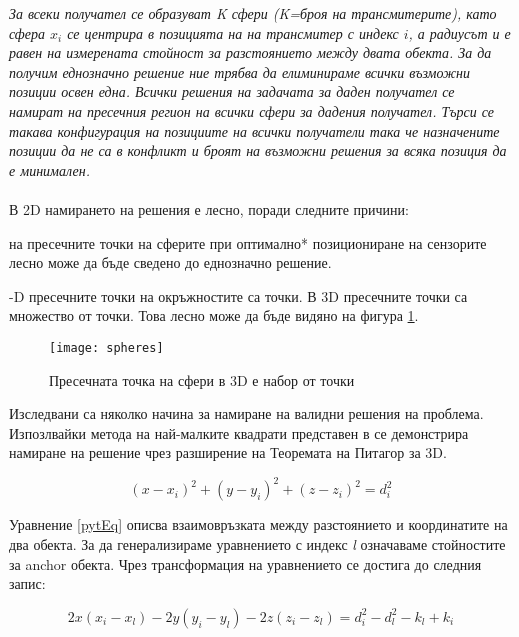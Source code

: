 \textit{За всеки получател се образуват K сфери (K=броя на трансмитерите), като сфера $x_i$ се центрира в позицията на на трансмитер с индекс $i$, а радиусът и е равен на измерената стойност за разстоянието между двата обекта. За да получим еднозначно решение ние трябва да елиминираме всички възможни позиции освен една. Всички решения на задачата за даден получател се намират на пресечния регион на всички сфери за дадения получател. Търси се такава конфигурация на позициите на всички получатели така че назначените позиции да не са в конфликт и броят на възможни решения за всяка позиция да е минимален.}\\\\



В 2D намирането на решения е лесно, поради следните причини:



\begin{enumerate}
     на пресечните точки на сферите при оптимално* позициониране на сензорите лесно може да бъде сведено до еднозначно решение.

    -D пресечните точки на окръжностите са точки. В 3D пресечните точки са множество от точки. Това лесно може да бъде видяно на фигура \ref{spheres}.
\end{enumerate}


\begin{figure}
    \centerline{\texttt{[image: spheres]}}
    \caption{Пресечната точка на сфери в 3D е набор от точки}
    \label{spheres}
\end{figure}




Изследвани са няколко начина за намиране на валидни решения на проблема. Изпозлвайки метода на най-малките квадрати представен в \cite{leastsq} се демонстрира намиране на решение чрез разширение на Теоремата на Питагор за 3D.

\begin{equation} \label{pytEq}
   (x-x_i)^2 + (y-y_i)^2 + (z-z_i)^2=d_i^2
\end{equation}



Уравнение \ref{pytEq} описва взаимовръзката между разстоянието и координатите на два обекта. За да генерализираме уравнението с индекс \textit{l} означаваме стойностите за anchor обекта. Чрез трансформация на уравнението се достига до следния запис:

\begin{equation} \label{pytEqTransformed}
  2 x (x_i - x_l) - 2 y (y_i - y_l) - 2  z  (z_i - z_l) = d^2_i - d^2_l - k_l + k_i
\end{equation}


